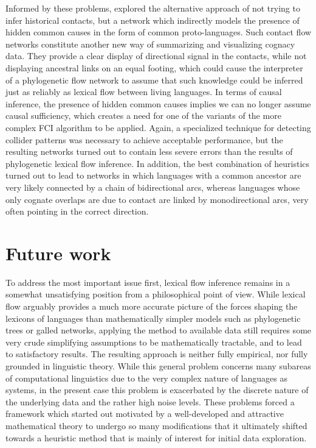 Informed by these problems,  explored the alternative approach of not trying to infer historical contacts, but a network which indirectly models the presence of hidden common causes in the form of common proto-languages. Such contact flow networks constitute another new way of summarizing and visualizing cognacy data. They provide a clear display of directional signal in the contacts, while not displaying ancestral links on an equal footing, which could cause the interpreter of a phylogenetic flow network to assume that such knowledge could be inferred just as reliably as lexical flow between living languages. In terms of causal inference, the presence of hidden common causes implies we can no longer assume causal sufficiency, which creates a need for one of the variants of the more complex FCI algorithm to be applied. Again, a specialized technique for detecting collider patterns was necessary to achieve acceptable performance, but the resulting networks turned out to contain less severe errors than the 
results of phylogenetic lexical flow inference. In addition, the best combination of heuristics turned out to lead to networks in which languages with a common ancestor are very likely connected by a chain of bidirectional arcs, whereas languages whose only cognate overlaps are due to contact are linked by monodirectional arcs, very often pointing in the correct direction. 

\section{Future work}
To address the most important issue first, lexical flow inference remains in a somewhat unsatisfying position from a philosophical point of view. While lexical flow arguably provides a much more accurate picture of the forces shaping the lexicons of languages than mathematically simpler models such as phylogenetic trees or galled networks, applying the method to available data still requires some very crude simplifying assumptions to be mathematically tractable, and to lead to satisfactory results. The resulting approach is neither fully empirical, nor fully grounded in linguistic theory. While this general problem concerns many subareas of computational linguistics due to the very complex nature of languages as systems, in the present case this problem is exacerbated by the discrete nature of the underlying data and the rather high noise levels. These problems forced a framework which started out motivated by a well-developed and attractive mathematical theory to undergo so many modifications that it ultimately shifted towards a heuristic method that is mainly of interest for initial data exploration.

